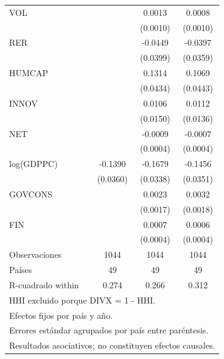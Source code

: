 {\begin{tabular}{l*{3}{c}}
VOL                 &                     &      0.0013         &      0.0008         \\
                    &                     &    (0.0010)         &    (0.0010)         \\
\addlinespace
RER                 &                     &     -0.0449         &     -0.0397         \\
                    &                     &    (0.0399)         &    (0.0359)         \\
\addlinespace
HUMCAP              &                     &      0.1314\sym{***}&      0.1069\sym{**} \\
                    &                     &    (0.0434)         &    (0.0443)         \\
\addlinespace
INNOV               &                     &      0.0106         &      0.0112         \\
                    &                     &    (0.0150)         &    (0.0136)         \\
\addlinespace
NET                 &                     &     -0.0009\sym{**} &     -0.0007\sym{**} \\
                    &                     &    (0.0004)         &    (0.0004)         \\
\addlinespace
log(GDPPC)          &     -0.1390\sym{***}&     -0.1679\sym{***}&     -0.1456\sym{***}\\
                    &    (0.0360)         &    (0.0338)         &    (0.0351)         \\
\addlinespace
GOVCONS             &                     &      0.0023         &      0.0032\sym{*}  \\
                    &                     &    (0.0017)         &    (0.0018)         \\
\addlinespace
FIN                 &                     &      0.0007\sym{*}  &      0.0006         \\
                    &                     &    (0.0004)         &    (0.0004)         \\
\midrule
Observaciones       &        1044         &        1044         &        1044         \\
Países              &          49         &          49         &          49         \\
R-cuadrado within   &       0.274         &       0.266         &       0.312         \\
\bottomrule
\multicolumn{4}{l}{\footnotesize HHI excluido porque DIVX = 1 - HHI.}\\
\multicolumn{4}{l}{\footnotesize Efectos fijos por país y año.}\\
\multicolumn{4}{l}{\footnotesize Errores estándar agrupados por país entre paréntesis.}\\
\multicolumn{4}{l}{\footnotesize Resultados asociativos; no constituyen efectos causales.}\\
\end{tabular}
}
